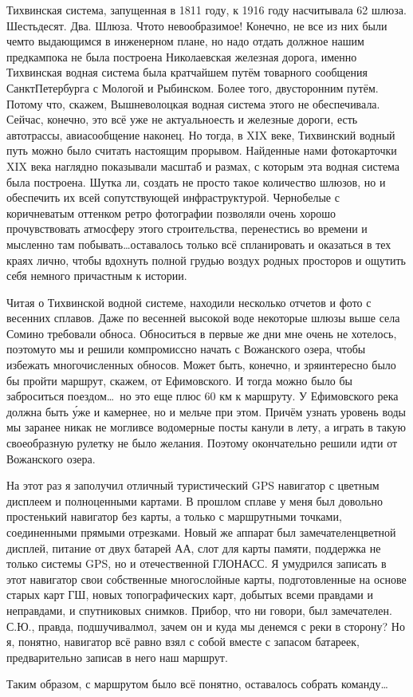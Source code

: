 Тихвинская система, запущенная в 1811 году, к 1916 году насчитывала 62 шлюза. Шестьдесят. Два. Шлюза. Что\sdash то невообразимое! Конечно, не все из них были чем\sdash то выдающимся в инженерном плане, но надо отдать должное нашим предкам\mdash пока не была построена Николаевская железная дорога, именно Тихвинская водная система была кратчайшем путём товарного сообщения Санкт\sdash Петербурга с Мологой и Рыбинском. Более того, двусторонним путём. Потому что, скажем, Вышневолоцкая водная система этого не обеспечивала. Сейчас, конечно, это всё уже не актуально\mdash есть и железные дороги, есть автотрассы, авиасообщение наконец. Но тогда, в XIX веке, Тихвинский водный путь можно было считать настоящим прорывом. Найденные нами фотокарточки XIX века наглядно показывали масштаб и размах, с которым эта водная система была построена. Шутка ли, создать не просто такое количество шлюзов, но и обеспечить их всей сопутствующей инфраструктурой. Черно\sdash белые с коричневатым оттенком ретро фотографии позволяли очень хорошо прочувствовать атмосферу этого строительства, перенестись во времени и мысленно там побывать\ldots оставалось только всё спланировать и оказаться в тех краях лично, чтобы вдохнуть полной грудью воздух родных просторов и ощутить себя немного причастным к истории.

Читая о Тихвинской водной системе, находили несколько отчетов и фото с весенних сплавов. Даже по весенней высокой воде некоторые шлюзы выше села Сомино требовали обноса. Обноситься в первые же дни мне очень не хотелось, поэтому\sdash то мы и решили компромиссно начать с Вожанского озера, чтобы избежать многочисленных обносов. Может быть, конечно, и зря\mdash интересно было бы пройти маршрут, скажем, от Ефимовского. И тогда можно было бы заброситься поездом\ldots~но это еще плюс 60 км к маршруту. У Ефимовского река должна быть \'{у}же и камернее, но и мельче при этом. Причём узнать уровень воды мы заранее никак не могли\mdash все водомерные посты канули в лету, а играть в такую своеобразную рулетку не было желания. Поэтому окончательно решили идти от Вожанского озера. 

На этот раз я заполучил отличный туристический GPS навигатор с цветным дисплеем и полноценными картами. В прошлом сплаве у меня был довольно простенький навигатор без карты, а только с маршрутными точками, соединенными прямыми отрезками. Новый же аппарат был замечателен\mdash цветной дисплей, питание от двух батарей АА, слот для карты памяти, поддержка не только системы GPS, но и отечественной ГЛОНАСС. Я умудрился записать в этот навигатор свои собственные многослойные карты, подготовленные на основе старых карт ГШ, новых топографических карт, добытых всеми правдами и неправдами, и спутниковых снимков. Прибор, что ни говори, был замечателен. С.Ю., правда, подшучивал\mdash мол, зачем он и куда мы денемся с реки в сторону?  Но я, понятно, навигатор всё равно взял с собой вместе с запасом батареек, предварительно записав в него наш маршрут.

Таким образом, с маршрутом было всё понятно, оставалось собрать команду\ldots

\begin{center}
\end{center}
